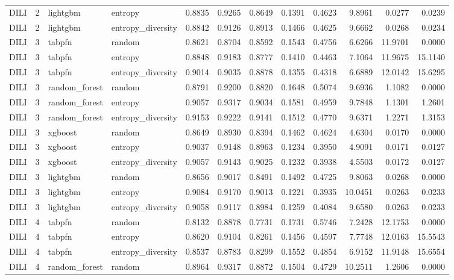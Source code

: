 \begin{tabular}{lrllrrrrrrrr}
DILI & 2 & lightgbm & entropy & 0.8835 & 0.9265 & 0.8649 & 0.1391 & 0.4623 & 9.8961 & 0.0277 & 0.0239 \\
DILI & 2 & lightgbm & entropy_diversity & 0.8842 & 0.9126 & 0.8913 & 0.1466 & 0.4625 & 9.6662 & 0.0268 & 0.0234 \\
DILI & 3 & tabpfn & random & 0.8621 & 0.8704 & 0.8592 & 0.1543 & 0.4756 & 6.6266 & 11.9701 & 0.0000 \\
DILI & 3 & tabpfn & entropy & 0.8848 & 0.9183 & 0.8777 & 0.1410 & 0.4463 & 7.1064 & 11.9675 & 15.1140 \\
DILI & 3 & tabpfn & entropy_diversity & 0.9014 & 0.9035 & 0.8878 & 0.1355 & 0.4318 & 6.6889 & 12.0142 & 15.6295 \\
DILI & 3 & random_forest & random & 0.8791 & 0.9200 & 0.8820 & 0.1648 & 0.5074 & 9.6936 & 1.1082 & 0.0000 \\
DILI & 3 & random_forest & entropy & 0.9057 & 0.9317 & 0.9034 & 0.1581 & 0.4959 & 9.7848 & 1.1301 & 1.2601 \\
DILI & 3 & random_forest & entropy_diversity & 0.9153 & 0.9222 & 0.9141 & 0.1512 & 0.4770 & 9.6371 & 1.2271 & 1.3153 \\
DILI & 3 & xgboost & random & 0.8649 & 0.8930 & 0.8394 & 0.1462 & 0.4624 & 4.6304 & 0.0170 & 0.0000 \\
DILI & 3 & xgboost & entropy & 0.9037 & 0.9148 & 0.8963 & 0.1234 & 0.3950 & 4.9091 & 0.0171 & 0.0127 \\
DILI & 3 & xgboost & entropy_diversity & 0.9057 & 0.9143 & 0.9025 & 0.1232 & 0.3938 & 4.5503 & 0.0172 & 0.0127 \\
DILI & 3 & lightgbm & random & 0.8656 & 0.9017 & 0.8491 & 0.1492 & 0.4725 & 9.8063 & 0.0268 & 0.0000 \\
DILI & 3 & lightgbm & entropy & 0.9084 & 0.9170 & 0.9013 & 0.1221 & 0.3935 & 10.0451 & 0.0263 & 0.0233 \\
DILI & 3 & lightgbm & entropy_diversity & 0.9058 & 0.9117 & 0.8984 & 0.1259 & 0.4084 & 9.6580 & 0.0263 & 0.0233 \\
DILI & 4 & tabpfn & random & 0.8132 & 0.8878 & 0.7731 & 0.1731 & 0.5746 & 7.2428 & 12.1753 & 0.0000 \\
DILI & 4 & tabpfn & entropy & 0.8620 & 0.9104 & 0.8261 & 0.1456 & 0.4597 & 7.7748 & 12.0163 & 15.5543 \\
DILI & 4 & tabpfn & entropy_diversity & 0.8537 & 0.8783 & 0.8299 & 0.1552 & 0.4854 & 6.9152 & 11.9148 & 15.6554 \\
DILI & 4 & random_forest & random & 0.8964 & 0.9317 & 0.8872 & 0.1504 & 0.4729 & 10.2511 & 1.2606 & 0.0000 \\

\end{tabular}
